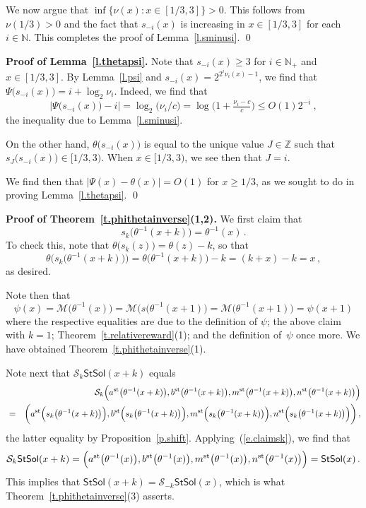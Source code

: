 \documentclass[letterpaper,11pt,oneside,reqno]{amsbook}
\newcommand{\N}{\ensuremath{\mathbb{N}}}
\newcommand{\Z}{\ensuremath{\mathbb{Z}}}
\numberwithin{figure}{chapter}
\theoremstyle{definition}
\theoremstyle{definition}
\theoremstyle{definition}
\theoremstyle{definition}
\theoremstyle{definition}
\newcommand{\mc}{\mathcal}
\newcommand{\ceemack}{\nu}
\newcommand{\nwithzero}{\N}
\newcommand{\nwithoutzero}{\N_+}
\newcommand{\asta}{a^{\rm st}}
\newcommand{\bst}{b^{\rm st}}
\newcommand{\mst}{m^{\rm st}}
\newcommand{\nst}{n^{\rm st}}
\newcommand{\solution}{\mathsf{StSol}}
\newcommand{\minamm}{\mathcal{M}}
\begin{document}
We now argue that $\inf \big\{ \ceemack(x): x \in [1/3,3] \big\} > 0$. This follows from $\ceemack(1/3) > 0$ and the fact that $s_{-i}(x)$ is increasing in $x \in [1/3,3]$ for each $i \in \nwithzero$. This completes the proof of Lemma~\ref{l.sminusi}. \qed

 {\bf Proof of Lemma~\ref{l.thetapsi}.}
 Note that $s_{-i}(x) \geq 3$ for $i \in \nwithoutzero$ and $x \in [1/3,3]$. By Lemma~\ref{l.psi} and $s_{-i}(x) = 2^{2^i \ceemack_i(x) - 1}$, we find that 
 $\Psi\big(s_{-i}(x)\big) = i + \log_2 \ceemack_i$. Indeed, we find that
 $$
  \big\vert \Psi \big( s_{-i}(x) \big) - i \big\vert = \log_2 \big( \ceemack_i/c \big) = \log \big( 1 + \tfrac{\ceemack_i - c}{c} \big) \leq O(1) 2^{-i} \ ,
 $$
 the inequality due to Lemma~\ref{l.sminusi}. 
 
 On the other hand, $\theta\big( s_{-i}(x) \big)$ is equal to the unique value $J \in \Z$ such that $s_J \big( s_{-i}(x) \big) \in [1/3,3)$.
 When $x \in [1/3,3)$, we see then that $J = i$.
 
 We find then that $\vert \Psi(x) - \theta(x) \vert = O(1)$ for $x \geq 1/3$, as we sought to do in proving Lemma~\ref{l.thetapsi}. \qed

{\bf Proof of Theorem~\ref{t.phithetainverse}(1,2).}
We first claim that 
\begin{equation}\label{e.claimsk}
 s_k \big( \theta^{-1}(x+k) \big) = \theta^{-1}(x) \, .
\end{equation}
To check this, note that $\theta \big( s_k(z) \big) = \theta(z) - k$, so that 
 $$
 \theta \Big( s_k \big( \theta^{-1}(x+k) \big) \Big) = \theta \big( \theta^{-1}(x+k)\big) - k = (k+x) - k
 = x \, ,
 $$
 as desired.


Note then that
$$
 \psi(x) =  \minamm \big( \theta^{-1}(x) \big) = \minamm \big( s \big( \theta^{-1}(x+1) \big) =  \minamm \big( \theta^{-1}(x+1) \big)  = \psi(x+1 )
$$ 
where the respective equalities are due to the definition of $\psi$; the above claim with $k=1$; Theorem~\ref{t.relativereward}(1); and the definition of~$\psi$ once more. We have obtained Theorem~\ref{t.phithetainverse}(1).

Note next that $\mc{S}_k \solution(x+k)$ equals
\begin{eqnarray*}
  &  & \mc{S}_k \Big( \asta\big( \theta^{-1}(x+k)  \big),  \bst\big( \theta^{-1}(x+k)  \big),  \mst\big( \theta^{-1}(x+k)  \big),  \nst\big( \theta^{-1}(x+k)  \big) \Big) \\
 & =  & \bigg( \asta \Big( s_k\big(\theta^{-1}(x+k) \big) \Big) ,  \bst \Big( s_k\big(\theta^{-1}(x+k) \big) \Big) , \mst \Big( s_k\big(\theta^{-1}(x+k) \big) \Big) , \nst \Big( s_k\big(\theta^{-1}(x+k) \big) \Big)  \bigg) \, ,
\end{eqnarray*}
the latter equality by Proposition~\ref{p.shift}. Applying~(\ref{e.claimsk}), we find that
 $$
 \mc{S}_k \solution(x+k)  =  \Big( \asta\big( \theta^{-1}(x)  \big),  \bst\big( \theta^{-1}(x)  \big),  \mst\big( \theta^{-1}(x)  \big),  \nst\big( \theta^{-1}(x)  \big) \Big)
 = \solution(x) \, .
 $$
 This implies that  $\solution(x+k) = 
 \mc{S}_{-k} \solution(x)$, which is what Theorem~\ref{t.phithetainverse}(3) asserts. 
\end{document}
